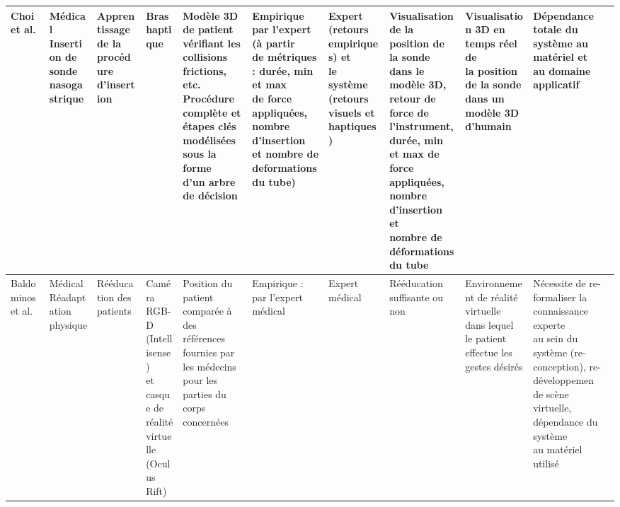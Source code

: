 \begin{landscape}
\begin{table}[]
{\begin{tabular}{|l|l|l|l|l|l|l|l|l|l|}
Choi et al. & \makecell[l]{Médical\\Insertion de\\sonde nasogastrique} & \makecell[l]{Apprentissage de la\\procédure d'insertion} & Bras haptique & \makecell[l]{Modèle 3D  de patient vérifiant les\\collisions frictions, etc.\\Procédure complète et étapes clés\\modélisées sous la forme\\d'un arbre de décision} & \makecell[l]{Empirique par l'expert (à partir\\de métriques : durée, min et max\\ de force appliquées, nombre d'insertion\\et nombre de deformations du tube)} & \makecell[l]{Expert (retours\\empiriques) et\\le système\\(retours visuels et haptiques)} & \makecell[l]{Visualisation de la position de la sonde\\dans le modèle 3D, retour de force de\\l'instrument, durée, min et max de\\force appliquées, nombre d'insertion et\\nombre de déformations du tube} & \makecell[l]{Visualisation 3D en temps réel de\\la position de la sonde dans un\\modèle 3D d'humain} & \makecell[l]{Dépendance totale du système au matériel et\\au domaine applicatif} \\ \hline

Baldominos et al. & \makecell[l]{Médical\\Réadaptation\\physique} & Rééducation des patients & \makecell[l]{Caméra RGB-D\\(Intellisense)\\et casque de\\réalité virtuelle\\(Oculus Rift)} & \makecell[l]{Position du patient comparée à des\\références fournies par les médecins\\pour les parties du corps concernées} & Empirique : par l'expert médical & Expert médical & Rééducation suffisante ou non & \makecell[l]{Environnement de réalité virtuelle\\dans lequel le patient\\effectue les gestes désirés} & \makecell[l]{Nécessite de re-formaliser la connaissance experte\\au sein du système (re-conception), re-développemen\\de scène virtuelle, dépendance du système\\au matériel utilisé} \\ \hline


\end{tabular}}
\end{table}
\end{landscape}

